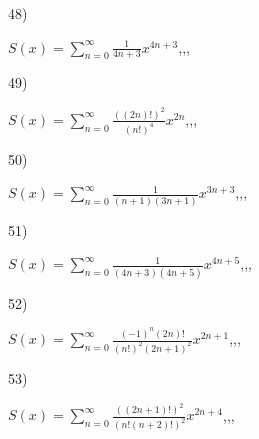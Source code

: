 \documentclass[11pt, ukrainian]{article}
\begin{document}
\par
\vspace{0.9cm}
48) \space 
{%
{$S(x)=\sum\limits_{n=0}^{\infty}{\frac{1}{4n+3}}{x^{{4n+3}}}$},,, \par \smallskip  
}
\par
\vspace{0.9cm}
49) \space 
{%
{$S(x)=\sum\limits_{n=0}^{\infty}{\frac{((2n)!)^2}{(n!)^4}}{x^{{2n}}}$},,, \par \smallskip  
}
\par
\vspace{0.9cm}
50) \space 
{%
{$S(x)=\sum\limits_{n=0}^{\infty}{\frac{1}{(n+1)(3n+1)}}{x^{{3n+3}}}$},,, \par \smallskip  
}
\par
\newpage
51) \space 
{%
{$S(x)=\sum\limits_{n=0}^{\infty}{\frac{1}{(4n+3)(4n+5)}}{x^{{4n+5}}}$},,, \par \smallskip  
}
\par
\vspace{0.9cm}
52) \space 
{%
{$S(x)=\sum\limits_{n=0}^{\infty}{\frac{{(-1)^n}(2n)!}{{(n!)^2}{(2n+1)^2}}}{x^{{2n+1}}}$},,, \par \smallskip  
}
\par
\vspace{0.9cm}
53) \space 
{%
{$S(x)=\sum\limits_{n=0}^{\infty}{\frac{((2n+1)!)^2}{(n!(n+2)!)^2}}{x^{{2n+4}}}$},,, \par \smallskip  
}
\end{document}
